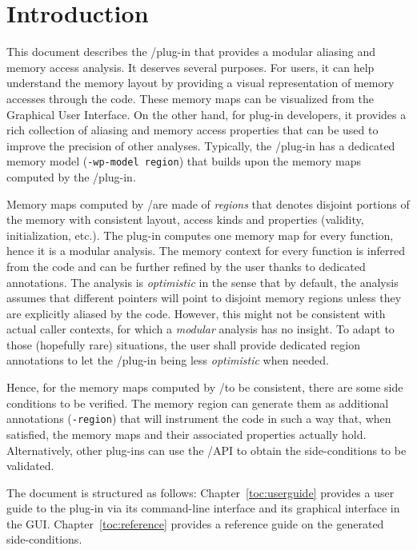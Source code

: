 \chapter*{Introduction}
\label{toc:introduction}

This document describes the \FramaC/\Region plug-in that provides a
modular aliasing and memory access analysis. It deserves several purposes. For
\FramaC users, it can help understand the memory layout by providing a visual
representation of memory accesses through the code. These memory maps can be
visualized from the \FramaC Graphical User Interface. On the other hand, for
\FramaC plug-in developers, it provides a rich collection of aliasing and memory
access properties that can be used to improve the precision of other analyses.
Typically, the \FramaC/\Wp plug-in has a dedicated memory model
(\verb$-wp-model region$) that builds upon the memory maps computed by the
\FramaC/\Region plug-in.

Memory maps computed by \FramaC/\Region are made of \emph{regions} that
denotes disjoint portions of the memory with consistent layout, access kinds and
properties (validity, initialization, etc.). The plug-in computes one memory map
for every function, hence it is a modular analysis. The memory context for every
function is inferred from the code and can be further refined by the user thanks
to dedicated \acsl annotations. The analysis is \emph{optimistic} in the sense
that by default, the analysis assumes that different pointers will point to
disjoint memory regions unless they are explicitly aliased by the code. However,
this might not be consistent with actual caller contexts, for which a
\emph{modular} analysis has no insight. To adapt to those (hopefully rare)
situations, the user shall provide dedicated region annotations to let the
\FramaC/\Region plug-in being less \emph{optimistic} when needed.

Hence, for the memory maps computed by \FramaC/\Region to be consistent, there
are some side conditions to be verified. The memory region can generate them as
additional \acsl annotations (\verb$-region$) that will instrument the code in
such a way that, when satisfied, the memory maps and their associated properties
actually hold. Alternatively, other plug-ins can use the \FramaC/\Region API to
obtain the side-conditions to be validated.

The document is structured as follows: Chapter~\ref{toc:userguide} provides a
user guide to the \Region plug-in via its command-line interface and its
graphical interface in the GUI. Chapter~\ref{toc:reference} provides
a reference guide on the generated side-conditions.
